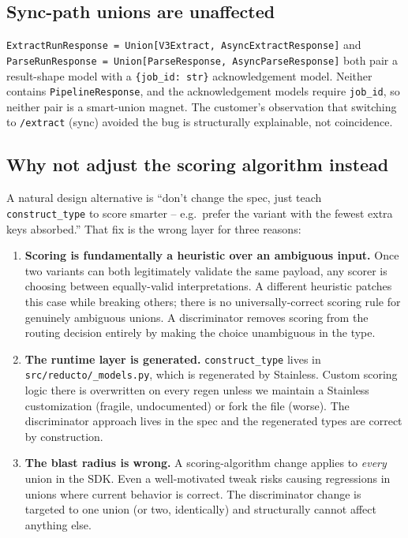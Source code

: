 \documentclass[11pt]{article}
\begin{document}
\subsection{Sync-path unions are unaffected}

\texttt{ExtractRunResponse = Union[V3Extract, AsyncExtractResponse]} and \texttt{ParseRunResponse = Union[ParseResponse, AsyncParseResponse]} both pair a result-shape model with a \texttt{\{job\_id: str\}} acknowledgement model. Neither contains \texttt{PipelineResponse}, and the acknowledgement models require \texttt{job\_id}, so neither pair is a smart-union magnet. The customer's observation that switching to \texttt{/extract} (sync) avoided the bug is structurally explainable, not coincidence.

\subsection{Why not adjust the scoring algorithm instead}

A natural design alternative is ``don't change the spec, just teach \texttt{construct\_type} to score smarter -- e.g.\ prefer the variant with the fewest extra keys absorbed.'' That fix is the wrong layer for three reasons:

\begin{enumerate}
  \item \textbf{Scoring is fundamentally a heuristic over an ambiguous input.} Once two variants can both legitimately validate the same payload, any scorer is choosing between equally-valid interpretations. A different heuristic patches this case while breaking others; there is no universally-correct scoring rule for genuinely ambiguous unions. A discriminator removes scoring from the routing decision entirely by making the choice unambiguous in the type.
  \item \textbf{The runtime layer is generated.} \texttt{construct\_type} lives in \texttt{src/reducto/\_models.py}, which is regenerated by Stainless. Custom scoring logic there is overwritten on every regen unless we maintain a Stainless customization (fragile, undocumented) or fork the file (worse). The discriminator approach lives in the spec and the regenerated types are correct by construction.
  \item \textbf{The blast radius is wrong.} A scoring-algorithm change applies to \emph{every} union in the SDK. Even a well-motivated tweak risks causing regressions in unions where current behavior is correct. The discriminator change is targeted to one union (or two, identically) and structurally cannot affect anything else.
\end{enumerate}
\end{document}
